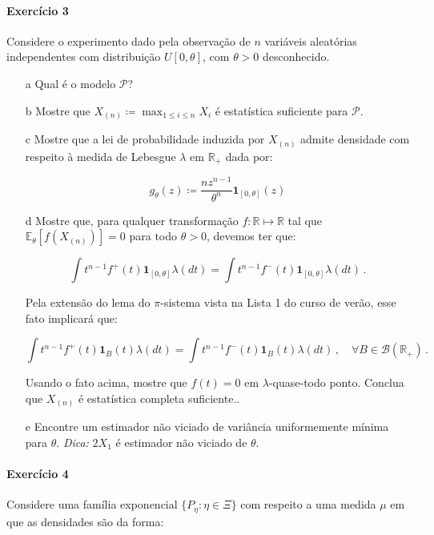 \documentclass[10pt,a4paper]{article}
\begin{document}
 \paragraph{Exercício 3} Considere o experimento dado pela observação de $n$ variáveis aleatórias independentes com distribuição $U[0,\theta]$, com $\theta > 0$ desconhecido.
 \begin{itemize}
 	\item[a] Qual é o modelo $\mathcal{P}$?
 	\item[b] Mostre que $X_{(n)} \coloneqq \max_{1\leq i \leq n} X_i$ é estatística suficiente para $\mathcal{P}$.
 	\item[c] Mostre que a lei de probabilidade induzida por $X_{(n)}$ admite densidade com respeito à medida de Lebesgue $\lambda$ em $\mathbb{R}_+$ dada por:
 	
 	$$g_\theta(z) \coloneqq \frac{n z^{n-1}}{\theta^n}\mathbf{1}_{[0,\theta]}(z)$$
 	
 	\item[d] Mostre que, para qualquer transformação $f: \mathbb{R} \mapsto \mathbb{R}$ tal que $\mathbb{E}_\theta[f(X_{(n)})] = 0$ para todo $\theta > 0$, devemos ter que:
 	
 	$$\int t^{n-1} f^+(t) \mathbf{1}_{[0,\theta]}\lambda(dt) = \int t^{n-1} f^-(t) \mathbf{1}_{[0,\theta]}\lambda(dt)\, .$$
 	
 	Pela extensão do lema do $\pi$-sistema vista na Lista 1 do curso de verão, esse fato implicará que:
 	
 	$$\int t^{n-1} f^+(t) \mathbf{1}_{B}(t)\lambda(dt) = \int t^{n-1} f^-(t) \mathbf{1}_{B}(t)\lambda(dt)\, ,\quad \forall B \in \mathcal{B}(\mathbb{R}_+)\, .$$
 	
 	Usando o fato acima, mostre que $f(t) = 0$ em $\lambda$-quase-todo ponto. Conclua que $X_{(n)}$ é estatística completa suficiente..
 	
 	\item[e] Encontre um estimador não viciado de variância uniformemente mínima para $\theta$. \textit{Dica:} $2 X_1$ é estimador não viciado de $\theta$.
 	
 	
 \end{itemize}
 
 \paragraph{Exercício 4} Considere uma família exponencial $\{P_\eta : \eta \in \Xi\}$ com respeito a uma medida $\mu$ em que as densidades são da forma:
 
\end{document}
